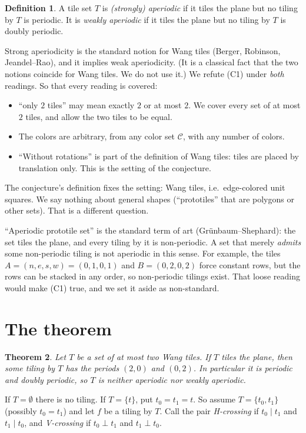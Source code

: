 \documentclass[11pt]{article}
\newtheorem{theorem}{Theorem}
\theoremstyle{definition}
\newtheorem{definition}[theorem]{Definition}
\theoremstyle{remark}
\begin{document}
\begin{definition}
A tile set $T$ is \emph{(strongly) aperiodic} if it tiles the plane but no
tiling by $T$ is periodic. It is \emph{weakly aperiodic} if it tiles the plane
but no tiling by $T$ is doubly periodic.
\end{definition}
Strong aperiodicity is the standard notion for Wang tiles (Berger, Robinson,
Jeandel--Rao), and it implies weak aperiodicity. (It is a classical fact that
the two notions coincide for Wang tiles. We do not use it.) We refute (C1) under
\emph{both} readings. So that every reading is covered:
\begin{itemize}
\item ``only $2$ tiles'' may mean exactly $2$ or at most $2$. We cover every set
of at most $2$ tiles, and allow the two tiles to be equal.
\item The colors are arbitrary, from any color set $\mathcal C$, with any number of
colors.
\item ``Without rotations'' is part of the definition of Wang tiles: tiles are
placed by translation only. This is the setting of the conjecture.
\end{itemize}
The conjecture's definition fixes the setting: Wang tiles, i.e.\ edge-colored unit
squares. We say nothing about general shapes (``prototiles'' that are polygons
or other sets). That is a different question.

``Aperiodic prototile set'' is the standard term of art (Gr\"unbaum--Shephard): the
set tiles the plane, and every tiling by it is non-periodic. A set that merely
\emph{admits} some non-periodic tiling is not aperiodic in this sense. For
example, the tiles $A=(n,e,s,w)=(0,1,0,1)$ and $B=(0,2,0,2)$ force constant rows,
but the rows can be stacked in any order, so non-periodic tilings exist. That loose
reading would make (C1) true, and we set it aside as non-standard.

\section{The theorem}
\begin{theorem}\label{thm:main}
Let $T$ be a set of at most two Wang tiles. If $T$ tiles the plane, then some
tiling by $T$ has the periods $(2,0)$ and $(0,2)$. In particular it is periodic
and doubly periodic, so $T$ is neither aperiodic nor weakly aperiodic.
\end{theorem}

If $T=\emptyset$ there is no tiling. If $T=\{t\}$, put $t_0=t_1=t$. So assume
$T=\{t_0,t_1\}$ (possibly $t_0=t_1$) and let $f$ be a tiling by $T$.
Call the pair \emph{H-crossing} if $t_0\mathrel{|}t_1$ and $t_1\mathrel{|}t_0$,
and \emph{V-crossing} if $t_0\mathrel{\bot}t_1$ and $t_1\mathrel{\bot}t_0$.
\end{document}
